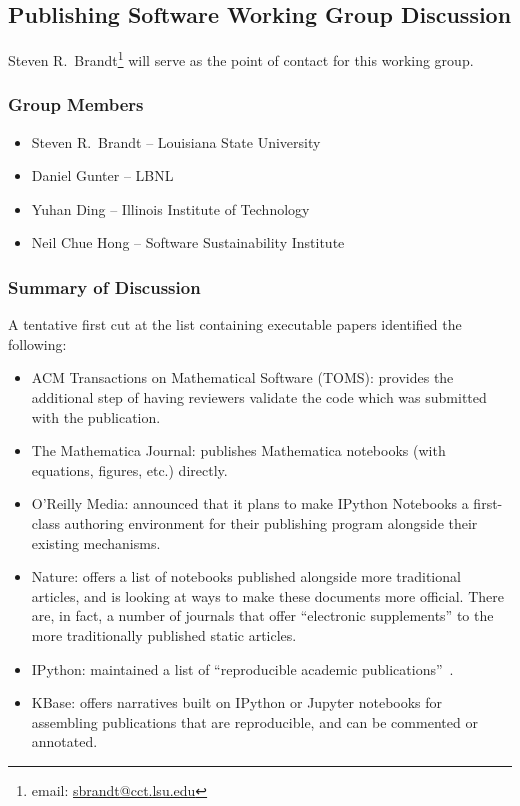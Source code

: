 \subsection{Publishing Software Working Group Discussion}
\label{sec:appendix_publishing_SW}

Steven R.\ Brandt\footnote{email:
\href{mailto:sbrandt@cct.lsu.edu}{sbrandt@cct.lsu.edu}} will serve as the point
of contact for this working group.

\subsubsection{Group Members}

\begin{itemize}
\item Steven R.\ Brandt -- Louisiana State University
\item Daniel Gunter -- LBNL
\item Yuhan Ding -- Illinois Institute of Technology
\item Neil Chue Hong -- Software Sustainability Institute
\end{itemize}

\subsubsection{Summary of Discussion}

A tentative first cut at the list containing executable papers identified the following:
\begin{itemize}

\item ACM Transactions on Mathematical Software (TOMS): provides the additional step
of having reviewers validate the code which was submitted with the publication.
 
\item The Mathematica Journal: publishes Mathematica notebooks (with equations,
figures, etc.) directly.

\item O'Reilly Media: announced that it plans to make IPython Notebooks a
first-class authoring environment for their publishing program alongside their
existing mechanisms.

\item Nature: offers a list of notebooks published alongside more traditional
articles, and is looking at ways to make these documents more official. There
are, in fact, a number of journals that offer ``electronic supplements'' to the
more traditionally published static articles.

\item IPython: maintained a list of ``reproducible academic
publications''~\cite{ipython-pubs}.

\item KBase: offers narratives built on IPython or Jupyter notebooks for assembling
publications that are reproducible, and can be commented or annotated.
  
\end{itemize}

